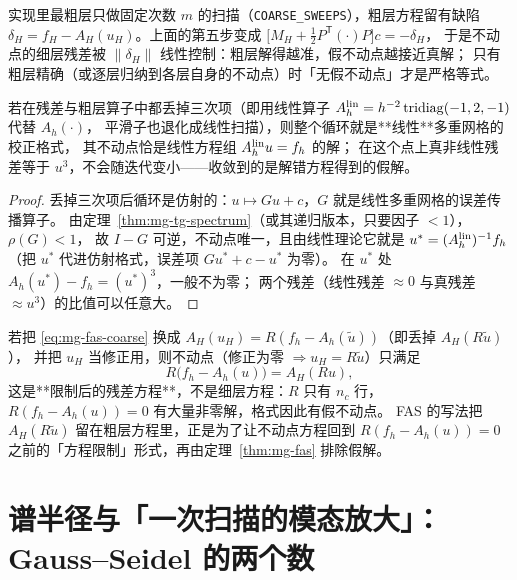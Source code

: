 \begin{remark}[粗层扫描次数有限时]
实现里最粗层只做固定次数 $m$ 的扫描（\texttt{COARSE\_SWEEPS}），粗层方程留有缺陷
$\delta_H=f_H-A_H(u_H)$。上面的第五步变成
$\bigl[M_H+\frac12P^{\mathsf T}(\cdot)P\bigr]c=-\delta_H$，
于是不动点的细层残差被 $\|\delta_H\|$ 线性控制：粗层解得越准，假不动点越接近真解；
只有粗层精确（或逐层归纳到各层自身的不动点）时「无假不动点」才是严格等式。
\end{remark}

\begin{theorem}[把非线性当线性解会收敛到错方程的解]
\label{thm:mg-false}
若在残差与粗层算子中都丢掉三次项（即用线性算子
$A_h^{\rm lin}=h^{-2}\operatorname{tridiag}(-1,2,-1)$ 代替 $A_h(\cdot)$，
平滑子也退化成线性扫描），则整个循环就是**线性**多重网格的校正格式，
其不动点恰是线性方程组 $A_h^{\rm lin}u=f_h$ 的解；
在这个点上真非线性残差等于 $u^3$，不会随迭代变小——收敛到的是解错方程得到的假解。
\end{theorem}

\begin{proof}
丢掉三次项后循环是仿射的：$u\mapsto Gu+c$，$G$ 就是线性多重网格的误差传播算子。
由定理~\ref{thm:mg-tg-spectrum}（或其递归版本，只要因子 $<1$），$\rho(G)<1$，
故 $I-G$ 可逆，不动点唯一，且由线性理论它就是
$u^\ast=(A_h^{\rm lin})^{-1}f_h$（把 $u^\ast$ 代进仿射格式，误差项 $Gu^\ast+c-u^\ast$ 为零）。
在 $u^\ast$ 处 $A_h(u^\ast)-f_h=(u^\ast)^3$，一般不为零；
两个残差（线性残差 $\approx0$ 与真残差 $\approx u^3$）的比值可以任意大。
\end{proof}

\begin{remark}
若把 \eqref{eq:mg-fas-coarse} 换成 $A_H(u_H)=R(f_h-A_h(\tilde u))$（即丢掉 $A_H(R\tilde u)$），
并把 $u_H$ 当修正用，则不动点（修正为零 $\Rightarrow u_H=R\tilde u$）只满足
\begin{equation}
  R\bigl(f_h-A_h(u)\bigr)=A_H(Ru),
\end{equation}
这是**限制后的残差方程**，不是细层方程：$R$ 只有 $n_c$ 行，
$R(f_h-A_h(u))=0$ 有大量非零解，格式因此有假不动点。
FAS 的写法把 $A_H(R\tilde u)$ 留在粗层方程里，正是为了让不动点方程回到
$R(f_h-A_h(u))=0$ 之前的「方程限制」形式，再由定理~\ref{thm:mg-fas} 排除假解。
\end{remark}

\section{谱半径与「一次扫描的模态放大」：Gauss--Seidel 的两个数}
\label{sec:mg-gs}


